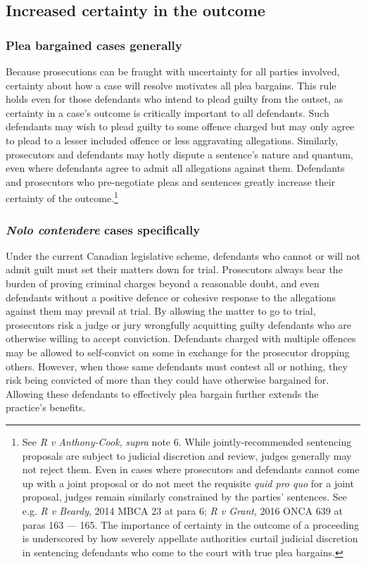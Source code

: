 \subsection{Increased certainty in the outcome}

\subsubsection{Plea bargained cases generally}

Because prosecutions can be fraught with uncertainty for all parties involved, certainty about how a case will resolve motivates all plea bargains. This rule holds even for those defendants who intend to plead guilty from the outset, as certainty in a case's outcome is critically important to all defendants. Such defendants may wish to plead guilty to some offence charged but may only agree to plead to a lesser included offence or less aggravating allegations. Similarly, prosecutors and defendants may hotly dispute a sentence's nature and quantum, even where defendants agree to admit all allegations against them. Defendants and prosecutors who pre-negotiate pleas and sentences greatly increase their certainty of the outcome.\footnote{See \textit{R v Anthony-Cook}, \textit{supra} note 6. While jointly-recommended sentencing proposals are subject to judicial discretion and review, judges generally may not reject them. Even in cases where prosecutors and defendants cannot come up with a joint proposal or do not meet the requisite \textit{quid pro quo} for a joint proposal, judges remain similarly constrained by the parties' sentences. See e.g. \textit{R v Beardy}, 2014 MBCA 23 at para 6; \textit{R v Grant}, 2016 ONCA 639 at paras 163 — 165. The importance of certainty in the outcome of a proceeding is underscored by how severely appellate authorities curtail judicial discretion in sentencing defendants who come to the court with true plea bargains.}

\subsubsection{\textit{Nolo contendere} cases specifically}

Under the current Canadian legislative scheme, defendants who cannot or will not admit guilt must set their matters down for trial. Prosecutors always bear the burden of proving criminal charges beyond a reasonable doubt, and even defendants without a positive defence or cohesive response to the allegations against them may prevail at trial. By allowing the matter to go to trial, prosecutors risk a judge or jury wrongfully acquitting guilty defendants who are otherwise willing to accept conviction. Defendants charged with multiple offences may be allowed to self-convict on some in exchange for the prosecutor dropping others. However, when those same defendants must contest all or nothing, they risk being convicted of more than they could have otherwise bargained for. Allowing these defendants to effectively plea bargain further extends the practice's benefits.

